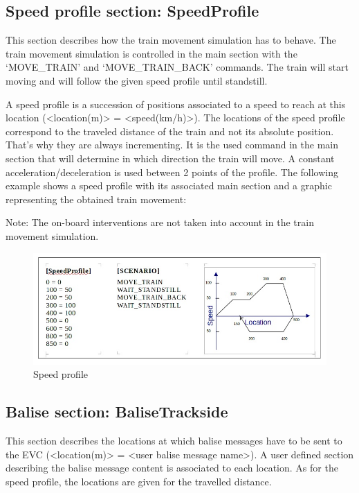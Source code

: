 \subsection{Speed profile section: SpeedProfile}

	This section describes how the train movement simulation has to behave. The train movement simulation is controlled in the main section with the ‘MOVE\_TRAIN’ and ‘MOVE\_TRAIN\_BACK’ commands. The train will start moving and will follow the given speed profile until standstill.

	A speed profile is a succession of positions associated to a speed to reach at this location (<location(m)> = <speed(km/h)>). The locations of the speed profile correspond to the traveled distance of the train and not its absolute position. That's why they are always incrementing. It is the used command in the main section that will determine in which direction the train will move.
	A constant acceleration/deceleration is used between 2 points of the profile.
	The following example shows a speed profile with its associated main section and a graphic representing the obtained train movement:

	Note: The on-board interventions are not taken into account in the train movement simulation.

	\begin{figure}[h]
		\centering
		\includegraphics[width=\textwidth]{image/test_runner_speed_profile.jpg}
		\caption{Speed profile}
		\label{fig:Speed profile}
	\end{figure}
	\subsection{Balise section: BaliseTrackside}

	This section describes the locations at which balise messages have to be sent to the EVC (<location(m)> = <user balise message name>). A user defined section describing the balise message content is associated to each location. As for the speed profile, the locations are given for the travelled distance.

